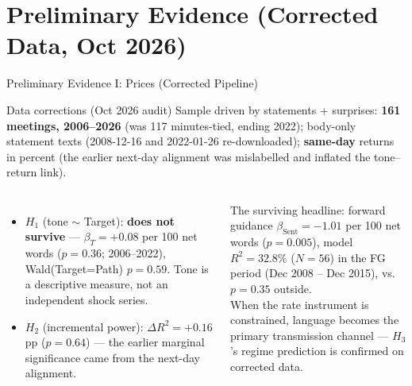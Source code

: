 \documentclass[aspectratio=169, 11pt]{beamer}
\begin{document}
\section{Preliminary Evidence (Corrected Data, Oct 2026)}

\begin{frame}{Preliminary Evidence I: Prices (Corrected Pipeline)}
  \footnotesize
  \begin{ablock}{Data corrections (Oct 2026 audit)}
    Sample driven by statements + surprises: \textbf{161 meetings, 2006--2026} (was 117 minutes-tied, ending 2022);
    body-only statement texts (2008-12-16 and 2022-01-26 re-downloaded); \textbf{same-day} returns in percent
    (the earlier next-day alignment was mislabelled and inflated the tone--return link).
  \end{ablock}
  \begin{columns}[T]
    \begin{itemize}
      \item $H_1$ (tone $\sim$ Target): \textbf{does not survive} --- $\beta_T = +0.08$ per 100 net words
            ($p=0.36$; 2006--2022), Wald(Target=Path) $p=0.59$. Tone is a descriptive measure, not an
            independent shock series.
      \item $H_2$ (incremental power): $\Delta R^2 = +0.16$ pp ($p=0.64$) --- the earlier marginal
            significance came from the next-day alignment.
    \end{itemize}
    \begin{agreenblock}{The surviving headline: forward guidance}
      $\beta_{\mathrm{Sent}} = -1.01$ per 100 net words ($p=0.005$), model $R^2 = 32.8\%$ ($N=56$) in the
      FG period (Dec 2008 -- Dec 2015), vs.\ $p=0.35$ outside. \\[0.3em]
      When the rate instrument is constrained, language becomes the primary transmission channel --- $H_3$'s
      regime prediction is confirmed on corrected data.
    \end{agreenblock}
  \end{columns}
\end{frame}
\end{document}
